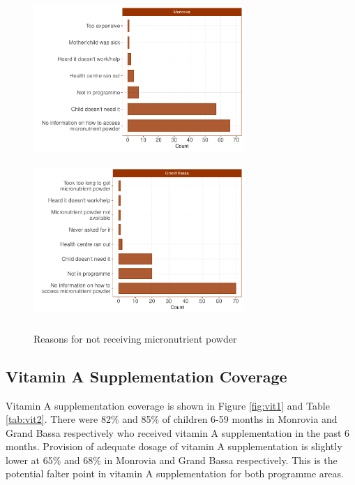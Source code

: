 \documentclass[12pt,a4paper]{article}
\begin{document}
\begin{figure}[H]

{\centering \includegraphics[width=8cm,height=6cm]{liberiaCoverageReport_files/figure-latex/mnp3a-1} \includegraphics[width=8cm,height=6cm]{liberiaCoverageReport_files/figure-latex/mnp3a-2} 

}

\caption{Reasons for not receiving micronutrient powder}\label{fig:mnp3a}
\end{figure}

\newpage

\hypertarget{vitamin-a-supplementation-coverage}{%
\subsection{Vitamin A Supplementation Coverage}\label{vitamin-a-supplementation-coverage}}

Vitamin A supplementation coverage is shown in Figure \ref{fig:vit1} and Table \ref{tab:vit2}. There were 82\% and 85\% of children 6-59 months in Monrovia and Grand Bassa respectively who received vitamin A supplementation in the past 6 months. Provision of adequate dosage of vitamin A supplementation is slightly lower at 65\% and 68\% in Monrovia and Grand Bassa respectively. This is the potential falter point in vitamin A supplementation for both programme areas.
\end{document}
